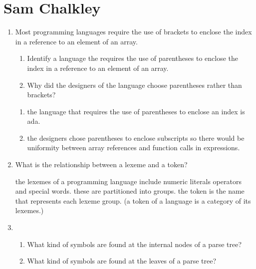 
\chapter{Sam Chalkley}

\begin{enumerate}
  \item Most programming languages require the use of brackets to
    enclose the index in a reference to an element of an array.
  \begin{enumerate}
    \item Identify a language the requires the use of parentheses
      to enclose the index in a reference to an element of an array.
    \item Why did the designers of the language choose parentheses
      rather than brackets?
    \end{enumerate}

  \begin{answer}

  \begin{enumerate}
    \item the language that requires the use of parentheses to enclose an index is ada.
    \item the designers chose parentheses to enclose subscripts so there would be uniformity between array references and function calls in expressions.
    \end{enumerate}

    \end{answer}
    
  \item What is the relationship between a lexeme and a token?

  \begin{answer}

    the lexemes of a programming language include numeric literals operators and special 
    words. these are partitioned into groups. the token is the name that represents each
    lexeme group. (a token of a language is a category of its lexemes.)

    \end{answer}

  \item
  \begin{enumerate}
    \item What kind of symbols are found at the internal nodes of a
      parse tree?
    \item What kind of symbols are found at the leaves of a parse tree?
    \end{enumerate}


\end{enumerate}
